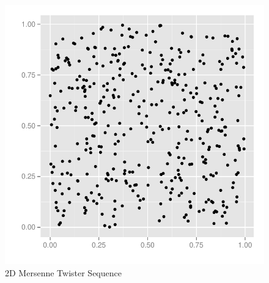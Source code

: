 \documentclass{beamer}
\begin{document}
\begin{frame}
\begin{minipage}[t]{0.48\linewidth}
  \end{minipage}
  \begin{minipage}[t]{0.48\linewidth}
    \begin{figure}
      \centering
      \includegraphics[width=\textwidth]{graphics/2D-mersenne-sequence.pdf}
      \vspace{-5mm}
      \caption{2D Mersenne Twister Sequence}
  \label{fig:2dmersenne}
\end{figure}

  \end{minipage}
\end{frame}
\end{document}
